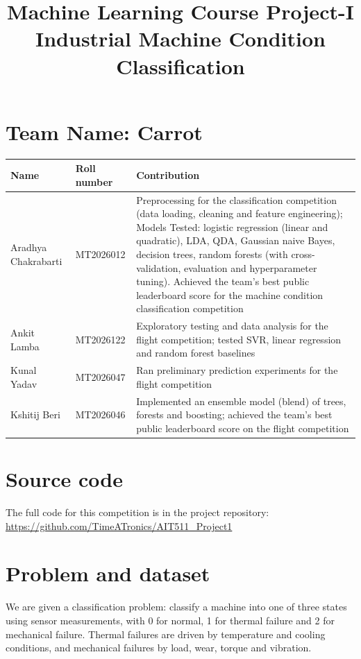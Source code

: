 \documentclass[11pt]{article}
\title{\textbf{Machine Learning Course Project-I}\\[0.3em]
       \large Industrial Machine Condition Classification}
\date{}
\begin{document}
\maketitle

\section*{Team Name: Carrot}
\begin{center}
\small
\begin{tabular}{@{}>{\raggedright\arraybackslash}p{3.4cm}l>{\raggedright\arraybackslash}p{9.2cm}@{}}
\toprule
Name & Roll number & Contribution \\
\midrule
Aradhya Chakrabarti & MT2026012 & Preprocessing for the classification competition (data loading, cleaning and feature engineering); Models Tested: logistic regression (linear and quadratic), LDA, QDA, Gaussian naive Bayes, decision trees, random forests (with cross-validation, evaluation and hyperparameter tuning). Achieved the team's best public leaderboard score for the machine condition classification competition \\
Ankit Lamba & MT2026122 & Exploratory testing and data analysis for the flight competition; tested SVR, linear regression and random forest baselines \\
Kunal Yadav & MT2026047 & Ran preliminary prediction experiments for the flight competition \\
Kshitij Beri & MT2026046 & Implemented an ensemble model (blend) of trees, forests and boosting; achieved the team's best public leaderboard score on the flight competition \\
\bottomrule
\end{tabular}
\end{center}

\section*{Source code}
The full code for this competition is in the project repository: \url{https://github.com/TimeATronics/AIT511_Project1}

\section{Problem and dataset}

We are given a classification problem: classify a machine into one of three states using sensor measurements, with 0 for normal, 1 for thermal failure and 2 for mechanical failure. Thermal failures are driven by temperature and cooling conditions, and mechanical failures by load, wear, torque and vibration.
\end{document}
